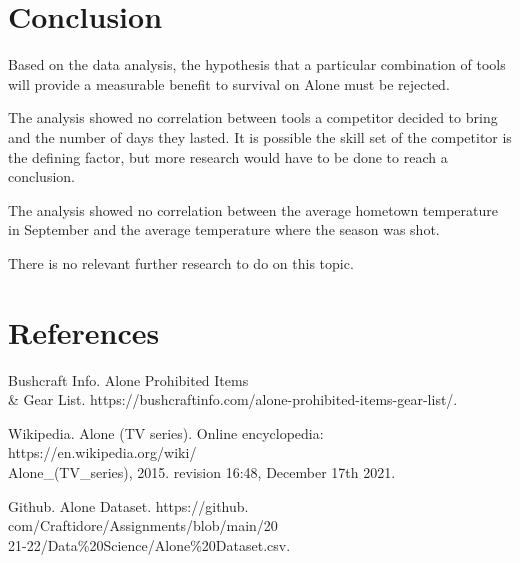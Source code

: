 \documentclass[letterpaper,twoside,11pt,twocolumn]{article}
\begin{document}
\section{Conclusion}

Based on the data analysis, the hypothesis that a particular combination of tools will provide a measurable benefit to survival on Alone must be rejected.

The analysis showed no correlation between tools a competitor decided to bring and the number of days they lasted. It is possible the skill set of the competitor is the defining factor, but more research would have to be done to reach a conclusion. 

The analysis showed no correlation between the average hometown temperature in September and the average temperature where the season was shot.

There is no relevant further research to do on this topic. 

\section{References}

\begin{enumerate}[ {[}1{]} ]
    \item Bushcraft Info. Alone Prohibited Items\\ \& Gear List.  https://bushcraftinfo.com/alone-prohibited-items-gear-list/. 
    \item Wikipedia. Alone (TV series). Online encyclopedia: https://en.wikipedia.org/wiki/\\Alone\_(TV\_series), 2015. revision 16:48, December 17th 2021.
    \item Github. Alone Dataset. https://github.\\com/Craftidore/Assignments/blob/main/20\\21-22/Data\%20Science/Alone\%20Dataset.csv. 
\end{enumerate}
\end{document}
